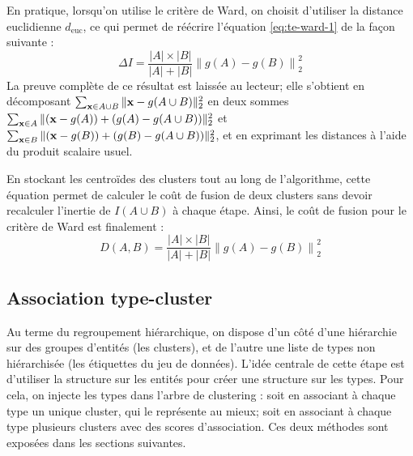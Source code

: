 En pratique, lorsqu'on utilise le critère de Ward, on choisit d'utiliser la distance euclidienne $d_\text{euc}$, ce qui permet de réécrire l'équation \ref{eq:te-ward-1} de la façon suivante :
\begin{equation}
    \Delta I = \frac{|A| \times |B|}{|A| + |B|} \left\| g(A) - g(B) \right\|_2^2
\end{equation}
La preuve complète de ce résultat est laissée au lecteur; elle s'obtient en décomposant $\sum_{\bf{x} \in A\cup B} \|\bf{x} - g(A \cup B) \|_2^2$ en deux sommes $\sum_{\bf{x} \in A} \|(\bf{x} - g(A)) + (g(A) - g(A \cup B)) \|_2^2$ et $\sum_{\bf{x} \in B} \|(\bf{x} - g(B)) + (g(B) - g(A \cup B)) \|_2^2$, et en exprimant les distances à l'aide du produit scalaire usuel.

En stockant les centroïdes des clusters tout au long de l'algorithme, cette équation permet de calculer le coût de fusion de deux clusters sans devoir recalculer l'inertie de $I(A\cup B)$ à chaque étape. Ainsi, le coût de fusion pour le critère de Ward est finalement :
\begin{equation}
    D(A, B) = \frac{|A| \times |B|}{|A| + |B|} \left\| g(A) - g(B) \right\|_2^2
\end{equation}





\subsection{Association type-cluster}
\label{subsec:te-mapping}


Au terme du regroupement hiérarchique, on dispose d'un côté d'une hiérarchie sur des groupes d'entités (les clusters), et de l'autre une liste de types non hiérarchisée (les étiquettes du jeu de données). L'idée centrale de cette étape est d'utiliser la structure sur les entités pour créer une structure sur les types. Pour cela, on injecte les types dans l'arbre de clustering : soit en associant à chaque type un unique cluster, qui le représente au mieux; soit en associant à chaque type plusieurs clusters avec des scores d'association. Ces deux méthodes sont exposées dans les sections suivantes.




